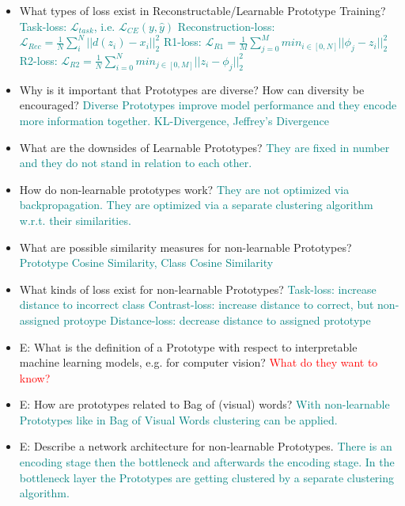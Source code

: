 \documentclass{report}
\newcommand{\asw}[2][teal]{}
\renewcommand{\asw}[2][teal]{\textcolor{#1}{#2}}
\newcommand{\qst}[2][red]{\textcolor{#1}{#2}}
\begin{document}
\begin{itemize}
	\item What types of loss exist in Reconstructable/Learnable Prototype Training?
	\asw{\newline Task-loss: $\mathcal{L}_{task}$, i.e. $\mathcal{L}_{CE}(y, \hat{y})$
		\newline Reconstruction-loss: $\mathcal{L}_{Rec} = \frac{1}{N} \sum_{i}^{N}||d(z_i) - x_i||^2_2$
		\newline R1-loss: $\mathcal{L}_{R1} = \frac{1}{M} \sum_{j=0}^{M} min_{i \in [0,N]} ||\phi_j - z_i||^2_2$
		\newline R2-loss: $\mathcal{L}_{R2} = \frac{1}{N} \sum_{i=0}^{N} min_{j \in [0,M]} ||z_i - \phi_j||^2_2$}
	\item Why is it important that Prototypes are diverse? How can diversity be encouraged?
	\asw{\newline Diverse Prototypes improve model performance and they encode more information together.
		\newline KL-Divergence, Jeffrey's Divergence}
	\item What are the downsides of Learnable Prototypes?
	\asw{\newline They are fixed in number and they do not stand in relation to each other.}
	\item How do non-learnable prototypes work?
	\asw{\newline They are not optimized via backpropagation. They are optimized via a separate clustering algorithm w.r.t. their similarities.}
	\item What are possible similarity measures for non-learnable Prototypes?
	\asw{\newline Prototype Cosine Similarity, Class Cosine Similarity}
	\item What kinds of loss exist for non-learnable Prototypes?
	\asw{\newline Task-loss: increase distance to incorrect class
		\newline Contrast-loss: increase distance to correct, but non-assigned protoype
		\newline Distance-loss: decrease distance to assigned prototype}
	\item E: What is the definition of a Prototype with respect to interpretable machine learning models, e.g. for computer vision?
	\asw{\newline \qst{What do they want to know?}}
	\item E: How are prototypes related to Bag of (visual) words?
	\asw{\newline With non-learnable Prototypes like in Bag of Visual Words clustering can be applied.}
	\item E: Describe a network architecture for non-learnable Prototypes.
	\asw{\newline There is an encoding stage then the bottleneck and afterwards the encoding stage. In the bottleneck layer the Prototypes are getting clustered by a separate clustering algorithm.}
	\end{itemize}
	\newpage
	
\end{document}
